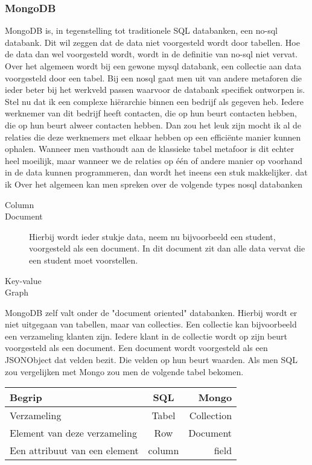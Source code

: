 \documentclass[a4paper,11pt]{article}
\newcommand{\head}[1]{\textnormal{\textbf{#1}}}
\begin{document}
\subsubsection{MongoDB}
MongoDB is, in tegenstelling tot traditionele SQL databanken, een 
no-sql databank. Dit wil zeggen dat de data niet voorgesteld wordt door 
tabellen. Hoe de data dan wel voorgesteld wordt, wordt in de definitie 
van no-sql niet vervat. Over het algemeen wordt bij een gewone mysql 
databank, een collectie aan data voorgesteld door een tabel. Bij een 
nosql gaat men uit van andere metaforen die ieder beter bij het 
werkveld passen waarvoor de databank specifiek ontworpen is. Stel nu 
dat ik een complexe hiërarchie binnen een bedrijf als gegeven heb. 
Iedere werknemer van dit bedrijf heeft contacten, die op hun beurt 
contacten hebben, die op hun beurt alweer contacten hebben. Dan zou 
het leuk zijn mocht ik al de relaties die deze werknemers met elkaar 
hebben op een efficiënte manier kunnen ophalen. Wanneer men vasthoudt 
aan de klassieke tabel metafoor is dit echter heel moeilijk, maar 
wanneer we de relaties op één of andere manier op voorhand in de data 
kunnen programmeren, dan wordt het ineens een stuk makkelijker.
dat ik  Over het algemeen kan men spreken over de 
volgende types nosql databanken

\begin{description}

\item[Column]
\item[Document] Hierbij wordt ieder stukje data, neem nu bijvoorbeeld 
een student, voorgesteld als een document. In dit document zit dan alle 
data vervat die een student moet voorstellen.
\item[Key-value]
\item[Graph]

\end{description}

MongoDB zelf valt onder de "document oriented" databanken. Hierbij wordt er niet uitgegaan van tabellen, maar van collecties. Een collectie kan bijvoorbeeld een verzameling klanten zijn. Iedere klant in de collectie wordt op zijn beurt voorgesteld als een document. Een document wordt voorgesteld als een JSONObject dat velden bezit. Die velden op hun beurt waarden. Als men SQL zou vergelijken met Mongo zou men de volgende tabel bekomen.

\begin{tabular}{lcr}
\hline
\head{Begrip} & \head{SQL} & \head{Mongo} \\
\hline
Verzameling & Tabel & Collection \\
Element van deze verzameling & Row & Document \\
Een attribuut van een element & column & field

\end{tabular}
\end{document}
